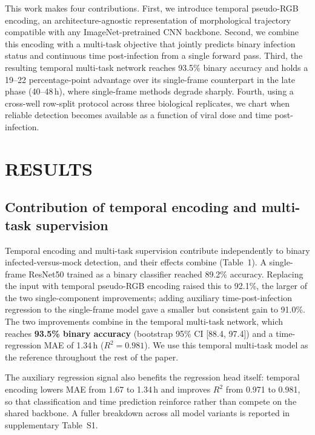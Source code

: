 \documentclass[12pt,letterpaper]{article}
\begin{document}
This work makes four contributions. First, we introduce temporal pseudo-RGB encoding, an architecture-agnostic representation of morphological trajectory compatible with any ImageNet-pretrained CNN backbone. Second, we combine this encoding with a multi-task objective that jointly predicts binary infection status and continuous time post-infection from a single forward pass. Third, the resulting temporal multi-task network reaches 93.5\% binary accuracy and holds a 19--22 percentage-point advantage over its single-frame counterpart in the late phase (40--48\,h), where single-frame methods degrade sharply. Fourth, using a cross-well row-split protocol across three biological replicates, we chart when reliable detection becomes available as a function of viral dose and time post-infection.

\section*{RESULTS}

\subsection*{Contribution of temporal encoding and multi-task supervision}

Temporal encoding and multi-task supervision contribute independently to binary infected-versus-mock detection, and their effects combine (Table~1). A single-frame ResNet50 trained as a binary classifier reached 89.2\% accuracy. Replacing the input with temporal pseudo-RGB encoding raised this to 92.1\%, the larger of the two single-component improvements; adding auxiliary time-post-infection regression to the single-frame model gave a smaller but consistent gain to 91.0\%. The two improvements combine in the temporal multi-task network, which reaches \textbf{93.5\% binary accuracy} (bootstrap 95\% CI [88.4, 97.4]) and a time-regression MAE of 1.34\,h ($R^2 = 0.981$). We use this temporal multi-task model as the reference throughout the rest of the paper.

The auxiliary regression signal also benefits the regression head itself: temporal encoding lowers MAE from 1.67 to 1.34\,h and improves $R^2$ from 0.971 to 0.981, so that classification and time prediction reinforce rather than compete on the shared backbone.\cite{ref-caruana1997mtl} A fuller breakdown across all model variants is reported in supplementary Table~S1.
\end{document}

